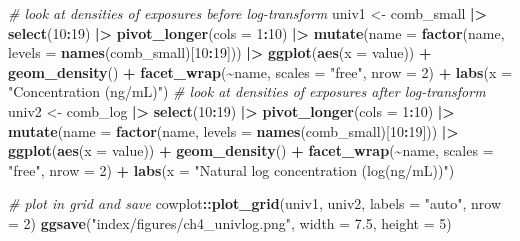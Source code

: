 \documentclass[12pt, twoside]{amherstthesis}
\newenvironment{Shaded}{\begin{snugshade}}{\end{snugshade}}
\newcommand{\AttributeTok}[1]{\textcolor[rgb]{0.13,0.29,0.53}{#1}}
\newcommand{\CommentTok}[1]{\textcolor[rgb]{0.56,0.35,0.01}{\textit{#1}}}
\newcommand{\DecValTok}[1]{\textcolor[rgb]{0.00,0.00,0.81}{#1}}
\newcommand{\FloatTok}[1]{\textcolor[rgb]{0.00,0.00,0.81}{#1}}
\newcommand{\FunctionTok}[1]{\textcolor[rgb]{0.13,0.29,0.53}{\textbf{#1}}}
\newcommand{\NormalTok}[1]{#1}
\newcommand{\OtherTok}[1]{\textcolor[rgb]{0.56,0.35,0.01}{#1}}
\newcommand{\SpecialCharTok}[1]{\textcolor[rgb]{0.81,0.36,0.00}{\textbf{#1}}}
\newcommand{\StringTok}[1]{\textcolor[rgb]{0.31,0.60,0.02}{#1}}
\begin{document}
\begin{Shaded}
\begin{Highlighting}[]
\CommentTok{\# look at densities of exposures before log{-}transform}
\NormalTok{univ1 }\OtherTok{\textless{}{-}}\NormalTok{ comb\_small }\SpecialCharTok{|\textgreater{}} 
  \FunctionTok{select}\NormalTok{(}\DecValTok{10}\SpecialCharTok{:}\DecValTok{19}\NormalTok{) }\SpecialCharTok{|\textgreater{}} 
  \FunctionTok{pivot\_longer}\NormalTok{(}\AttributeTok{cols =} \DecValTok{1}\SpecialCharTok{:}\DecValTok{10}\NormalTok{) }\SpecialCharTok{|\textgreater{}} 
  \FunctionTok{mutate}\NormalTok{(}\AttributeTok{name =} \FunctionTok{factor}\NormalTok{(name, }\AttributeTok{levels =} \FunctionTok{names}\NormalTok{(comb\_small)[}\DecValTok{10}\SpecialCharTok{:}\DecValTok{19}\NormalTok{])) }\SpecialCharTok{|\textgreater{}} 
  \FunctionTok{ggplot}\NormalTok{(}\FunctionTok{aes}\NormalTok{(}\AttributeTok{x =}\NormalTok{ value)) }\SpecialCharTok{+}
  \FunctionTok{geom\_density}\NormalTok{() }\SpecialCharTok{+}
  \FunctionTok{facet\_wrap}\NormalTok{(}\SpecialCharTok{\textasciitilde{}}\NormalTok{name, }\AttributeTok{scales =} \StringTok{"free"}\NormalTok{, }\AttributeTok{nrow =} \DecValTok{2}\NormalTok{) }\SpecialCharTok{+}
  \FunctionTok{labs}\NormalTok{(}\AttributeTok{x =} \StringTok{"Concentration (ng/mL)"}\NormalTok{)}
\CommentTok{\# look at densities of exposures after log{-}transform}
\NormalTok{univ2 }\OtherTok{\textless{}{-}}\NormalTok{ comb\_log }\SpecialCharTok{|\textgreater{}} 
  \FunctionTok{select}\NormalTok{(}\DecValTok{10}\SpecialCharTok{:}\DecValTok{19}\NormalTok{) }\SpecialCharTok{|\textgreater{}} 
  \FunctionTok{pivot\_longer}\NormalTok{(}\AttributeTok{cols =} \DecValTok{1}\SpecialCharTok{:}\DecValTok{10}\NormalTok{) }\SpecialCharTok{|\textgreater{}} 
  \FunctionTok{mutate}\NormalTok{(}\AttributeTok{name =} \FunctionTok{factor}\NormalTok{(name, }\AttributeTok{levels =} \FunctionTok{names}\NormalTok{(comb\_small)[}\DecValTok{10}\SpecialCharTok{:}\DecValTok{19}\NormalTok{])) }\SpecialCharTok{|\textgreater{}} 
  \FunctionTok{ggplot}\NormalTok{(}\FunctionTok{aes}\NormalTok{(}\AttributeTok{x =}\NormalTok{ value)) }\SpecialCharTok{+}
  \FunctionTok{geom\_density}\NormalTok{() }\SpecialCharTok{+}
  \FunctionTok{facet\_wrap}\NormalTok{(}\SpecialCharTok{\textasciitilde{}}\NormalTok{name, }\AttributeTok{scales =} \StringTok{"free"}\NormalTok{, }\AttributeTok{nrow =} \DecValTok{2}\NormalTok{) }\SpecialCharTok{+}
  \FunctionTok{labs}\NormalTok{(}\AttributeTok{x =} \StringTok{"Natural log concentration (log(ng/mL))"}\NormalTok{)}

\CommentTok{\# plot in grid and save}
\NormalTok{cowplot}\SpecialCharTok{::}\FunctionTok{plot\_grid}\NormalTok{(univ1, univ2, }\AttributeTok{labels =} \StringTok{"auto"}\NormalTok{, }\AttributeTok{nrow =} \DecValTok{2}\NormalTok{)}
\FunctionTok{ggsave}\NormalTok{(}\StringTok{"index/figures/ch4\_univlog.png"}\NormalTok{, }\AttributeTok{width =} \FloatTok{7.5}\NormalTok{, }\AttributeTok{height =} \DecValTok{5}\NormalTok{)}
\end{Highlighting}
\end{Shaded}
\normalsize
\end{document}
